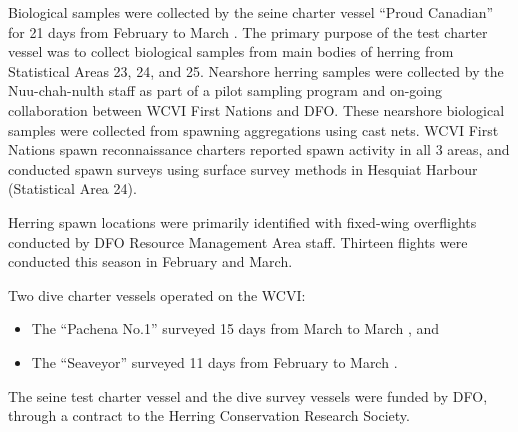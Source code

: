 Biological samples were collected by the seine charter vessel ``Proud Canadian'' for 21 days from February  to March .
The primary purpose of the test charter vessel was to collect biological samples from main bodies of herring from Statistical Areas 23, 24, and 25.
Nearshore herring samples were collected by the Nuu-chah-nulth staff as part of a pilot sampling program and on-going collaboration between WCVI First Nations and DFO.
These nearshore biological samples were collected from spawning aggregations using cast nets.
WCVI First Nations spawn reconnaissance charters reported spawn activity in all 3 areas, and conducted spawn surveys using surface survey methods in Hesquiat Harbour (Statistical Area 24).

Herring spawn locations were primarily identified with fixed-wing overflights conducted by DFO Resource Management Area staff.
Thirteen flights were conducted this season in February and March.

Two dive charter vessels operated on the WCVI:
\begin{itemize}
\item The ``Pachena No.1'' surveyed 15 days from March  to March , and
\item The ``Seaveyor'' surveyed 11 days from February  to March .
\end{itemize}
The seine test charter vessel and the dive survey vessels were funded by DFO, through a contract to the Herring Conservation Research Society.